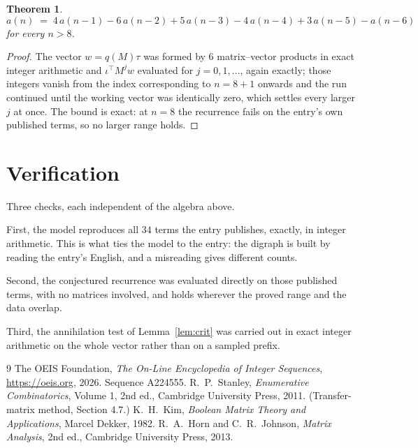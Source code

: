 \documentclass[11pt,a4paper]{article}
\theoremstyle{plain}
\newtheorem{theorem}{Theorem}
\theoremstyle{definition}
\begin{document}
\begin{theorem}
\[
a(n)\;=\;4\,a(n-1) - 6\,a(n-2) + 5\,a(n-3) - 4\,a(n-4) + 3\,a(n-5) - a(n-6)
\]
for every $n>8$.
\end{theorem}

\begin{proof}
The vector $w=q(M)\tau$ was formed by $6$ matrix--vector products in exact integer
arithmetic and $\iota^{\!\top}M^{j}w$ evaluated for $j=0,1,\dots$, again exactly; those
integers vanish from the index corresponding to $n=8+1$ onwards and the run continued
until the working vector was identically zero, which settles every larger $j$ at once. The bound is exact: at $n=8$ the recurrence fails on the entry's own published terms, so no larger range holds.
\end{proof}

\section{Verification}

Three checks, each independent of the algebra above.

First, the model reproduces all $34$ terms the entry publishes, exactly, in integer
arithmetic. This is what ties the model to the entry: the digraph is built by reading the
entry's English, and a misreading gives different counts.

Second, the conjectured recurrence was evaluated directly on those published terms, with no
matrices involved, and holds wherever the proved range and the data overlap.

Third, the annihilation test of Lemma~\ref{lem:crit} was carried out in exact integer
arithmetic on the whole vector rather than on a sampled prefix.

\begin{thebibliography}{9}
 The OEIS Foundation, \emph{The On-Line Encyclopedia of Integer
Sequences}, \url{https://oeis.org}, 2026. Sequence A224555.
 R.~P.~Stanley, \emph{Enumerative Combinatorics}, Volume 1, 2nd ed.,
Cambridge University Press, 2011. (Transfer-matrix method, Section 4.7.)
 K.~H.~Kim, \emph{Boolean Matrix Theory and Applications}, Marcel Dekker,
1982.
 R.~A.~Horn and C.~R.~Johnson, \emph{Matrix Analysis}, 2nd ed., Cambridge
University Press, 2013.
\end{thebibliography}
\end{document}
